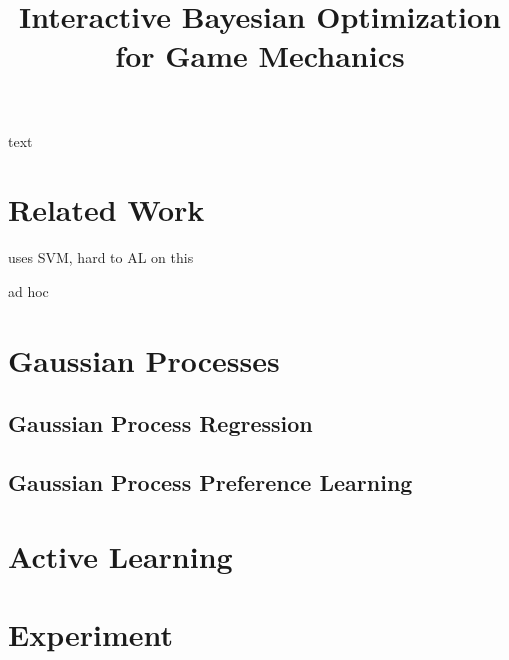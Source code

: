 \documentclass[letterpaper]{article}
\begin{document}
%
\title{Interactive Bayesian Optimization for Game Mechanics}
\author{
}



\maketitle
\begin{abstract}
\begin{quote}
\end{quote}
\end{abstract}

\noindent text

\section{Related Work}

\cite{yu2011:minboredom} uses SVM, hard to AL on this

\cite{hunicke2004:dda} ad hoc


\section{Gaussian Processes}

\subsection{Gaussian Process Regression}
\cite{rasmussen2006}

\subsection{Gaussian Process Preference Learning}
\cite{chu2005} 

\cite{brochu2010:thesis}


\section{Active Learning}
\cite{settles2012:al-book}


\section{Experiment}
\end{document}
